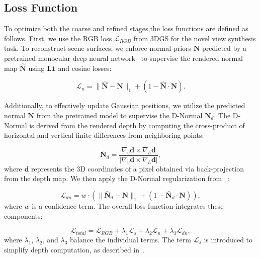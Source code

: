 \subsection{Loss Function}  
\label{3.3}
To optimize both the coarse and refined stages,the loss functions are defined as follows. First, we use the RGB loss $\mathcal{L}_{RGB}$ from 3DGS for the novel view synthesis task. To reconstruct scene surfaces, we enforce normal priors $\mathbf{N}$ predicted by a pretrained monocular deep neural network~\cite{BaeD24} to supervise the rendered normal map $\hat{\mathbf{N}}$ using $\mathbf{L1}$ and cosine losses:

\begin{equation}
    \mathcal{L}_n = \| \hat{\mathbf{N}} - \mathbf{N} \|_1 + (1 - \hat{\mathbf{N}} \cdot \mathbf{N}).
\label{eq2}
\end{equation}







Additionally, to effectively update Gaussian positions, we utilize the predicted normal $\mathbf{N}$ from the pretrained model to supervise the D-Normal $\overline{\mathbf{N}}_d$. The D-Normal is derived from the rendered depth by computing the cross-product of horizontal and vertical finite differences from neighboring points:

\begin{equation}
\overline{\mathbf{N}}_d = \frac{\nabla_v \mathbf{d} \times \nabla_h \mathbf{d}}{\left|\nabla_v \mathbf{d} \times \nabla_h \mathbf{d}\right|},
\label{eq5}
\end{equation}
where $\mathbf{d}$ represents the 3D coordinates of a pixel obtained via back-projection from the depth map. We then apply the D-Normal regularization from ~\cite{vcR}:

\begin{equation}
    \mathcal{L}_{dn} = w \cdot \left(\| \bar{\mathbf{N}}_d - \mathbf{N} \|_1 + (1 - \bar{\mathbf{N}}_d \cdot \mathbf{N})\right),
\label{eq8}
\end{equation}
where $w$ is a confidence term. The overall loss function integrates these components:

\begin{equation}
    \mathcal{L}_{total} = \mathcal{L}_{RGB} + \lambda_1 \mathcal{L}_s + \lambda_2 \mathcal{L}_n + \lambda_3 \mathcal{L}_{dn},
\label{eq9}
\end{equation}
where $\lambda_1$, $\lambda_2$, and $\lambda_3$ balance the individual terms. The term $\mathcal{L}_s$ is introduced to simplify depth computation, as described in~\cite{vcR}.





